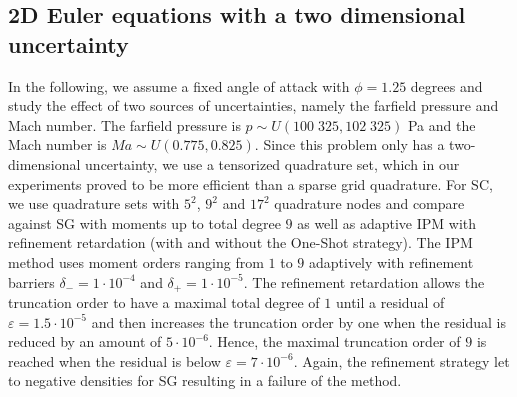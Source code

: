 \subsection{2D Euler equations with a two dimensional uncertainty}

In the following, we assume a fixed angle of attack with $\phi = 1.25$ degrees and study the effect of two sources of uncertainties, namely the farfield pressure and Mach number. The farfield pressure is ${p \sim U(100\;325,102\;325)}$ Pa and the Mach number is $Ma \sim U(0.775,0.825)$. Since this problem only has a two-dimensional uncertainty, we use a tensorized quadrature set, which in our experiments proved to be more efficient than a sparse grid quadrature. For SC, we use quadrature sets with $5^2$, $9^2$ and $17^2$ quadrature nodes and compare against SG with moments up to total degree $9$ as well as adaptive IPM with refinement retardation (with and without the One-Shot strategy). The IPM method uses moment orders ranging from $1$ to $9$ adaptively with refinement barriers $\delta_{-} = 1\cdot 10^{-4}$ and $\delta_{+} = 1\cdot 10^{-5}$. The refinement retardation allows the truncation order to have a maximal total degree of $1$ until a residual of $\varepsilon = 1.5\cdot 10^{-5}$ and then increases the truncation order by one when the residual is reduced by an amount of $5\cdot 10^{-6}$. Hence, the maximal truncation order of $9$ is reached when the residual is below $\varepsilon = 7\cdot 10^{-6}$. Again, the refinement strategy let to negative densities for SG resulting in a failure of the method.

